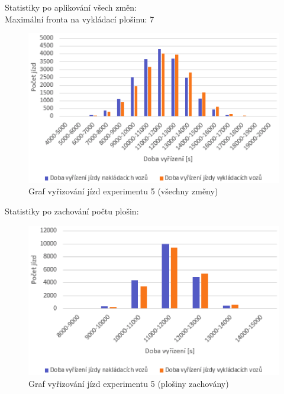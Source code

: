 \documentclass[a4paper, 11pt]{article}
\begin{document}
Statistiky po aplikování všech změn:\\

Maximální fronta na vykládací plošinu: 7 \\

\begin{figure}[h!]
\begin{center}
\includegraphics[scale=0.75]{exp5.eps}
\caption{Graf vyřizování jízd experimentu 5 (všechny změny)}
\end{center}
\end{figure}

Statistiky po zachování počtu plošin: \\

\begin{figure}[h!]
\begin{center}
\includegraphics[scale=0.75]{exp5_2.eps}
\caption{Graf vyřizování jízd experimentu 5 (plošiny zachovány)}
\end{center}
\end{figure}
\newpage
\end{document}
